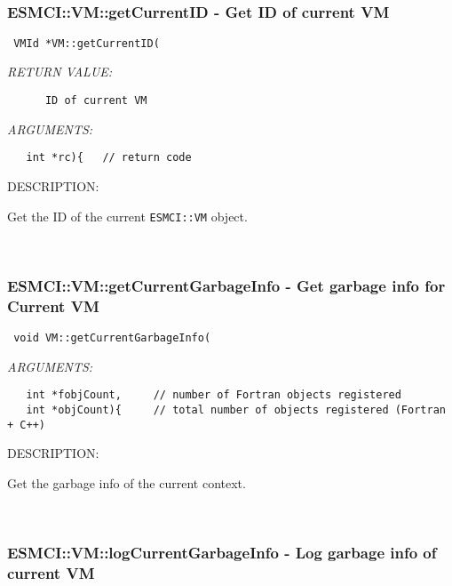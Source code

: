 {\mbox{}\hrulefill\
 
\subsubsection [ESMCI::VM::getCurrentID] {ESMCI::VM::getCurrentID - Get ID of current VM}


  
\begin{verbatim} VMId *VM::getCurrentID(\end{verbatim}{\em RETURN VALUE:}
\begin{verbatim}      ID of current VM\end{verbatim}{\em ARGUMENTS:}
\begin{verbatim}   int *rc){   // return code\end{verbatim}
{\sf DESCRIPTION:\\ }


     Get the ID of the current {\tt ESMCI::VM} object.
   
 
\mbox{}\hrulefill\
 
\subsubsection [ESMCI::VM::getCurrentGarbageInfo] {ESMCI::VM::getCurrentGarbageInfo - Get garbage info for Current VM}


  
\begin{verbatim} void VM::getCurrentGarbageInfo(\end{verbatim}{\em ARGUMENTS:}
\begin{verbatim}   int *fobjCount,     // number of Fortran objects registered
   int *objCount){     // total number of objects registered (Fortran + C++)\end{verbatim}
{\sf DESCRIPTION:\\ }


     Get the garbage info of the current context.
   
 
\mbox{}\hrulefill\
 
\subsubsection [ESMCI::VM::logCurrentGarbageInfo] {ESMCI::VM::logCurrentGarbageInfo - Log garbage info of current VM}


}
